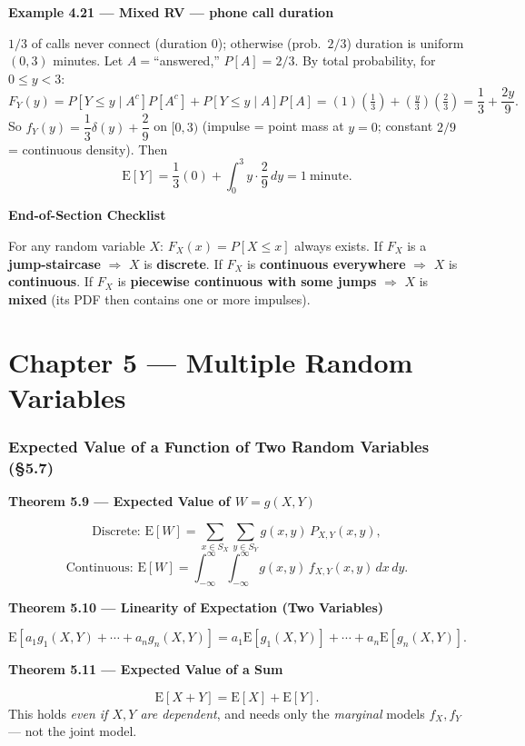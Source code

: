 \documentclass[11pt]{article}
\newcommand{\E}[1]{\mathrm{E}\left[#1\right]}
\renewcommand{\P}[1]{P\left[#1\right]}
\newcommand{\topline}[1]{\par\vspace{5pt}\noindent{\color{#1}\rule{\linewidth}{1.1pt}}\par\vspace{3pt}}
\newcommand{\botline}[1]{\par\vspace{2pt}\noindent{\color{#1}\rule{\linewidth}{1.1pt}}\par\vspace{8pt}}
\newenvironment{thmbox}[2]{%
  \topline{thmcol}\noindent\textbf{\color{thmcol}Theorem #1 --- #2}\par\smallskip\noindent\ignorespaces
}{\botline{thmcol}}
\newenvironment{exbox}[2]{%
  \topline{exmcol}\noindent\textbf{\color{exmcol}Example #1 --- #2}\par\smallskip\noindent\ignorespaces
}{\botline{exmcol}}
\newenvironment{notebox}[1]{%
  \topline{notecol}\noindent\textbf{\color{notecol}#1}\par\smallskip\noindent\ignorespaces
}{\botline{notecol}}
\begin{document}
\begin{exbox}{4.21}{Mixed RV --- phone call duration}
$1/3$ of calls never connect (duration 0); otherwise (prob.\ $2/3$) duration is uniform$(0,3)$
minutes. Let $A=$``answered,'' $\P{A}=2/3$. By total probability, for $0\le y<3$:
\[ F_Y(y) = \P{Y\le y\mid A^c}\P{A^c}+\P{Y\le y\mid A}\P{A} = (1)\!\left(\tfrac13\right)+\left(\tfrac{y}{3}\right)\!\left(\tfrac23\right)=\frac13+\frac{2y}{9}. \]
So $f_Y(y) = \dfrac13\delta(y)+\dfrac29$ on $[0,3)$ (impulse = point mass at $y=0$; constant
$2/9$ = continuous density). Then
\[ \E{Y} = \frac13(0)+\int_0^3 y\cdot\frac29\,dy = 1\ \text{minute}. \]
\end{exbox}

\begin{notebox}{End-of-Section Checklist}
For any random variable $X$: $F_X(x)=\P{X\le x}$ always exists. If $F_X$ is a
\textbf{jump-staircase} $\Rightarrow$ $X$ is \textbf{discrete}. If $F_X$ is
\textbf{continuous everywhere} $\Rightarrow$ $X$ is \textbf{continuous}. If $F_X$ is
\textbf{piecewise continuous with some jumps} $\Rightarrow$ $X$ is \textbf{mixed} (its PDF
then contains one or more impulses).
\end{notebox}

\clearpage
\part{Chapter 5 --- Multiple Random Variables}
\section{Expected Value of a Function of Two Random Variables (\S5.7)}
\label{sec:57}

\begin{thmbox}{5.9}{Expected Value of $W=g(X,Y)$}
\[
\text{Discrete: } \E{W} = \sum_{x\in S_X}\sum_{y\in S_Y} g(x,y)\,P_{X,Y}(x,y),
\]
\[
\text{Continuous: } \E{W} = \int_{-\infty}^{\infty}\!\int_{-\infty}^{\infty} g(x,y)\,f_{X,Y}(x,y)\,dx\,dy.
\]
\end{thmbox}

\begin{thmbox}{5.10}{Linearity of Expectation (Two Variables)}
\[ \E{a_1g_1(X,Y)+\cdots+a_ng_n(X,Y)} = a_1\E{g_1(X,Y)}+\cdots+a_n\E{g_n(X,Y)}. \]
\end{thmbox}

\begin{thmbox}{5.11}{Expected Value of a Sum}
\[ \E{X+Y} = \E{X}+\E{Y}. \]
This holds \emph{even if $X,Y$ are dependent}, and needs only the \emph{marginal} models
$f_X,f_Y$ --- not the joint model.
\end{thmbox}
\end{document}
